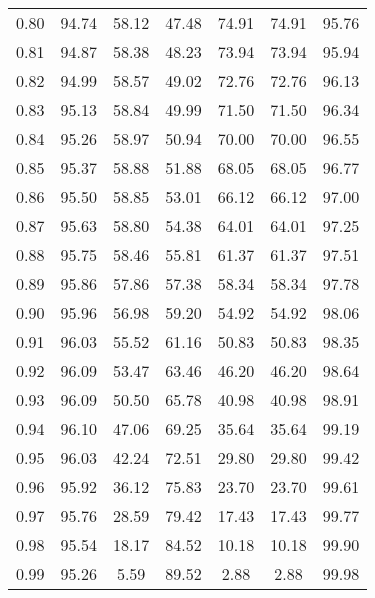 \begin{tabular}{|c|c|c|c|c|c|c|}
      0.80 &     94.74 &     58.12 &      47.48 &   74.91 &      74.91 &         95.76 \\
      0.81 &     94.87 &     58.38 &      48.23 &   73.94 &      73.94 &         95.94 \\
      0.82 &     94.99 &     58.57 &      49.02 &   72.76 &      72.76 &         96.13 \\
      0.83 &     95.13 &     58.84 &      49.99 &   71.50 &      71.50 &         96.34 \\
      0.84 &     95.26 &     58.97 &      50.94 &   70.00 &      70.00 &         96.55 \\
      0.85 &     95.37 &     58.88 &      51.88 &   68.05 &      68.05 &         96.77 \\
      0.86 &     95.50 &     58.85 &      53.01 &   66.12 &      66.12 &         97.00 \\
      0.87 &     95.63 &     58.80 &      54.38 &   64.01 &      64.01 &         97.25 \\
      0.88 &     95.75 &     58.46 &      55.81 &   61.37 &      61.37 &         97.51 \\
      0.89 &     95.86 &     57.86 &      57.38 &   58.34 &      58.34 &         97.78 \\
      0.90 &     95.96 &     56.98 &      59.20 &   54.92 &      54.92 &         98.06 \\
      0.91 &     96.03 &     55.52 &      61.16 &   50.83 &      50.83 &         98.35 \\
      0.92 &     96.09 &     53.47 &      63.46 &   46.20 &      46.20 &         98.64 \\
      0.93 &     96.09 &     50.50 &      65.78 &   40.98 &      40.98 &         98.91 \\
      0.94 &     96.10 &     47.06 &      69.25 &   35.64 &      35.64 &         99.19 \\
      0.95 &     96.03 &     42.24 &      72.51 &   29.80 &      29.80 &         99.42 \\
      0.96 &     95.92 &     36.12 &      75.83 &   23.70 &      23.70 &         99.61 \\
      0.97 &     95.76 &     28.59 &      79.42 &   17.43 &      17.43 &         99.77 \\
      0.98 &     95.54 &     18.17 &      84.52 &   10.18 &      10.18 &         99.90 \\
      0.99 &     95.26 &      5.59 &      89.52 &    2.88 &       2.88 &         99.98 \\
\bottomrule
\end{tabular}
